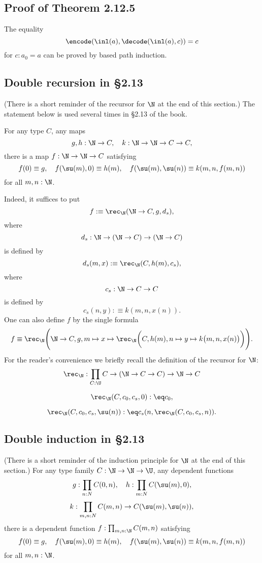 \documentclass[12pt]{article}
\begin{document}

\subsection{Proof of Theorem 2.12.5}

The equality 
$$
\encode(\inl(a),\decode(\inl(a),c))=c
$$ 
for $c:a_0=a$ can be proved by based path induction.


\subsection{Double recursion in \S2.13}

(There is a short reminder of the recursor for $\N$ at the end of this section.) The statement below is used several times in \S2.13 of the book.

For any type $C$, any maps 
$$
g,h:\N\to C,\quad k:\N\to\N\to C\to C,
$$ 
there is a map $f:\N\to\N\to C$ satisfying 
$$
f(0)\equiv g,\quad f(\su(m),0)\equiv h(m),\quad f(\su(m),\su(n))\equiv k(m,n,f(m,n))
$$ 
for all $m,n:\N$.

Indeed, it suffices to put 
$$
f:\equiv\rec_\N(\N\to C,g,d_s),
$$ 
where 
$$
d_s:\N\to(\N\to C)\to(\N\to C)
$$ 
is defined by 
$$
d_s(m,x):\equiv\rec_\N(C,h(m),c_s),
$$ 
where 
$$
c_s:\N\to C\to C
$$ 
is defined by 
$$
c_s(n,y):\equiv k(m,n,x(n)).
$$ 
One can also define $f$ by the single formula
$$
f\equiv\rec_\N\Bigg(\N\to C,g,m\mapsto x\mapsto\rec_\N\bigg(C,h(m),n\mapsto y\mapsto k\big(m,n,x(n)\big)\bigg)\Bigg).
$$ 
For the reader's convenience we briefly recall the definition of the recursor for $\N$:
$$\rec_\N:\prod_{C:\U}C\to(\N\to C\to C)\to\N\to C$$

$$\rec_\N(C,c_0,c_s,0):\eq c_0,$$

$$\rec_\N(C,c_0,c_s,\su(n)):\eq c_s(n,\rec_\N(C,c_0,c_s,n)).$$


\subsection{Double induction in \S2.13}

(There is a short reminder of the induction principle for $\N$ at the end of this section.) For any type family $C:\N\to\N\to\U$, any dependent functions
$$
g:\prod_{n:N}C(0,n),\quad h:\prod_{m:N}C(\su(m),0),
$$
$$
k:\prod_{m,n:N}C(m,n)\to C(\su(m),\su(n)),
$$ 
there is a dependent function $f:\prod_{m,n:\N}C(m,n)$ satisfying 
$$
f(0)\equiv g,\quad f(\su(m),0)\equiv h(m),\quad f(\su(m),\su(n))\equiv k(m,n,f(m,n))
$$ 
for all $m,n:\N$.
\end{document}
